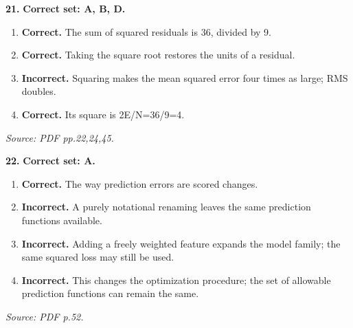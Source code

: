 \documentclass[11pt,a4paper]{article}
\begin{document}
\par\noindent\begin{minipage}{\linewidth}
\textbf{21.} \textbf{Correct set: A, B, D.}
\begin{enumerate}[label=(\Alph*),leftmargin=8mm,itemsep=2pt,topsep=2pt]
\item \textbf{Correct.} The sum of squared residuals is 36, divided by 9.
\item \textbf{Correct.} Taking the square root restores the units of a residual.
\item \textbf{Incorrect.} Squaring makes the mean squared error four times as large; RMS doubles.
\item \textbf{Correct.} Its square is 2E/N=36/9=4.
\end{enumerate}
{\footnotesize\textit{Source: PDF pp.22,24,45.}}

\end{minipage}\par\vspace{3mm}
\par\noindent\begin{minipage}{\linewidth}
\textbf{22.} \textbf{Correct set: A.}
\begin{enumerate}[label=(\Alph*),leftmargin=8mm,itemsep=2pt,topsep=2pt]
\item \textbf{Correct.} The way prediction errors are scored changes.
\item \textbf{Incorrect.} A purely notational renaming leaves the same prediction functions available.
\item \textbf{Incorrect.} Adding a freely weighted feature expands the model family; the same squared loss may still be used.
\item \textbf{Incorrect.} This changes the optimization procedure; the set of allowable prediction functions can remain the same.
\end{enumerate}
{\footnotesize\textit{Source: PDF p.52.}}

\end{minipage}\par\vspace{3mm}
\end{document}
